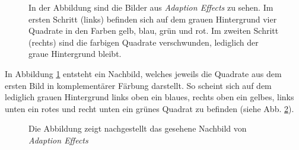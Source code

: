 \documentclass[11pt]{article}
\begin{document}
\begin{figure}[H]
\caption{In der Abbildung sind die Bilder aus \textit{Adaption Effects} zu sehen. Im ersten Schritt (links) befinden sich auf dem grauen Hintergrund vier Quadrate in den Farben gelb, blau, grün und rot. Im zweiten Schritt (rechts) sind die farbigen Quadrate verschwunden, lediglich der graue Hintergrund bleibt.}
\label{4farben}
\end{figure}

In Abbildung \ref{4farben} entsteht ein Nachbild, welches jeweils die Quadrate aus dem ersten Bild in komplementärer Färbung darstellt. So scheint sich auf dem lediglich grauen Hintergrund links oben ein blaues, rechts oben ein gelbes, links unten ein rotes und recht unten ein grünes Quadrat zu befinden (siehe Abb. \ref{4farben_nb}). 

\begin{figure}[H]
\caption{Die Abbildung zeigt nachgestellt das gesehene Nachbild von \textit{Adaption Effects}}
\label{4farben_nb}
\end{figure}
\end{document}
